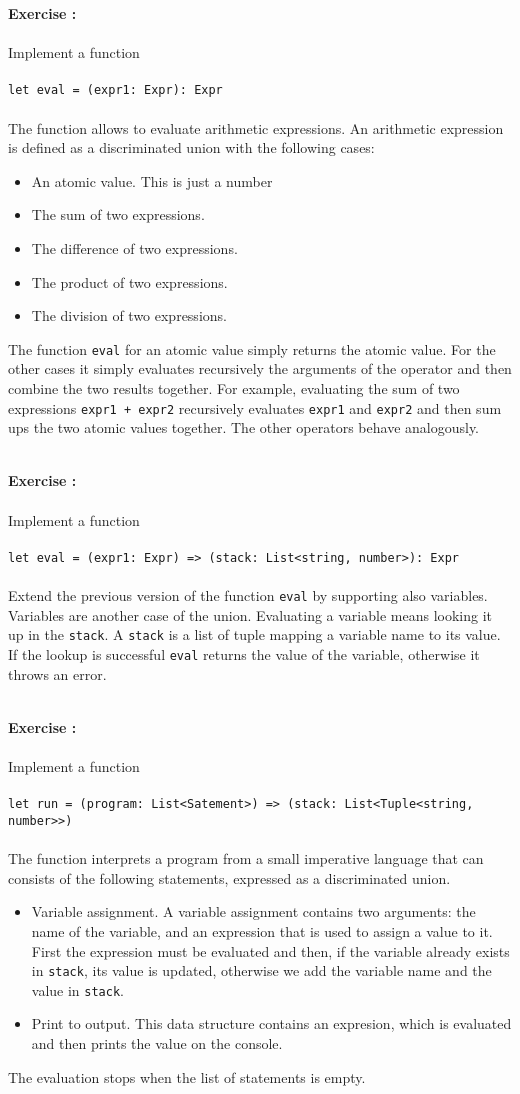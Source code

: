 \documentclass[]{article}
\newcounter{ExerciseCount}
\newcommand{\functionEx}[3]{
  Implement a function\\\\
   \texttt{let #1 = #2}\\\\ #3
}
\newcommand{\exercise}[1]{\noindent \textbf{Exercise \theExerciseCount:}\\\\ #1 \addtocounter{ExerciseCount}{1}
}
\begin{document}
\exercise{
  \functionEx{eval}{(expr1: Expr): Expr}{
  The function allows to evaluate arithmetic expressions. An arithmetic expression is defined as a discriminated union with the following cases:
  
  \begin{itemize}[noitemsep]
  \item An atomic value. This is just a number
  \item The sum of two expressions.
  \item The difference of two expressions.
  \item The product of two expressions.
  \item The division of two expressions.
  \end{itemize}
  
 The function \texttt{eval} for an atomic value simply returns the atomic value. For the other cases it simply evaluates recursively the arguments of the operator and then combine the two results together. For example, evaluating the sum of two expressions \texttt{expr1 + expr2} recursively evaluates \texttt{expr1} and \texttt{expr2} and then sum ups the two atomic values together. The other operators behave analogously.
}}\\

\exercise{
  \functionEx{eval}{(expr1: Expr) => (stack: List<string, number>): Expr}{
  Extend the previous version of the function \texttt{eval} by supporting also variables. Variables are another case of the union. Evaluating a variable means looking it up in the \texttt{stack}. A \texttt{stack} is a list of tuple mapping a variable name to its value. If the lookup is successful \texttt{eval} returns the value of the variable, otherwise it throws an error.
}}\\

\exercise{
  \functionEx{run}{(program: List<Satement>) => (stack: List<Tuple<string, number>>)}{
  The function interprets a program from a small imperative language that can consists of the following statements, expressed as a discriminated union.
  
  \begin{itemize}[noitemsep]
  \item Variable assignment. A variable assignment contains two arguments: the name of the variable, and an expression that is used to assign a value to it. First the expression must be evaluated and then, if the variable already exists in \texttt{stack}, its value is updated, otherwise we add the variable name and the value in \texttt{stack}.
  \item Print to output. This data structure contains an expresion, which is evaluated and then prints the value on the console.
  \end{itemize}
  
  The evaluation stops when the list of statements is empty.
}}\\
\end{document}
